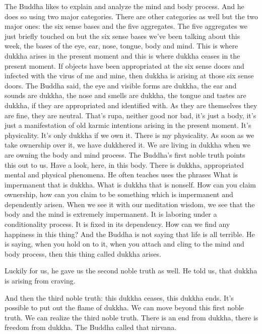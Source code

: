 \documentclass[letterpaper,10pt,english]{sphinxmanual}
\begin{document}
\sphinxAtStartPar
The Buddha likes to explain and analyze the mind and body process.
And  he  does  so  using  two  major  categories. There  are  other  categories  as
well  but  the  two  major  ones:  the  six  sense  bases  and  the  five  aggregates.
The five aggregates we just briefly touched on but the six sense bases we’ve
been talking about this week, the bases of the eye, ear, nose, tongue, body
and  mind.
This  is  where  dukkha
arises in the present moment and this is where dukkha ceases in the present  moment.  If  objects  have  been  appropriated  at  the  six  sense  doors  and
infected with the virus of me and mine, then dukkha is arising at those six
sense  doors.  The  Buddha  said,  the  eye  and  visible  forms  are  dukkha,  the
ear and sounds are dukkha, the nose and smells are dukkha, the tongue and
tastes are dukkha, if they are appropriated and identified with. As they are
themselves they are fine, they are neutral. That’s rupa, neither good nor bad,
it’s just a body, it’s just a manifestation of old karmic intentions arising in
the present moment. It’s physicality. It’s only dukkha if we own it. There is
my physicality. As soon as we take ownership over it, we have dukkhered
it. We are living in dukkha when we are owning the body and mind process.
The Buddha’s first noble truth points this out to us. Have a look, here,
in this body. There is dukkha, appropriated mental and physical phenomena.
He often teaches uses the phrases
What is impermanent that is dukkha. What is dukkha that is non\sphinxhyphen{}self.
How can you claim ownership, how can you claim to be something which
is impermanent and dependently arisen. When we see it with our meditation
wisdom, we see that the body and the mind is extremely impermanent. It is
laboring under a conditionality process. It is fixed in its dependency. How
can we find any happiness in this thing? And the Buddha is not saying that
  life is all terrible. He is saying, when you hold on to it, when you attach and
cling to the mind and body process, then this thing called dukkha arises.

\sphinxAtStartPar
Luckily for us, he gave us the second noble truth as well. He told us,
that dukkha is arising from craving.

\sphinxAtStartPar
And then the third noble truth: this dukkha ceases, this dukkha ends.
It’s possible to put out the flame of dukkha. We can move beyond this first
noble truth. We can realize the third noble truth. There is an end from dukkha,
there is freedom from dukkha. The Buddha called that nirvana.
\end{document}
